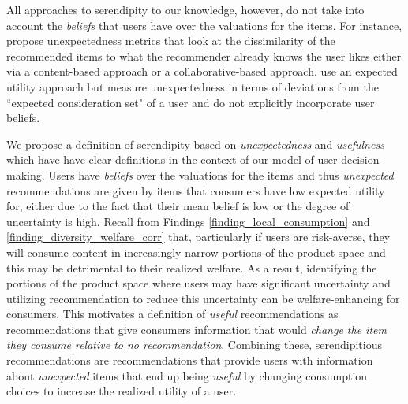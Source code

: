 \documentclass[sigconf]{acmart}
\begin{document}
All approaches to serendipity to our knowledge, however, do not take into account the \textit{beliefs} that users have over the valuations for the items. For instance, \cite{vargas2011rank, kaminskas2014measuring} propose unexpectedness metrics that look at the dissimilarity of the recommended items to what the recommender already knows the user likes either via a content-based approach or a collaborative-based approach. \cite{adamopoulos2015unexpectedness} use an expected utility approach but measure unexpectedness in terms of deviations from the ``expected consideration set" of a user and do not explicitly incorporate user beliefs.

We propose a definition of serendipity based on \textit{unexpectedness} and \textit{usefulness} which have have clear definitions in the context of our model of user decision-making. Users have \textit{beliefs} over the valuations for the items and thus \textit{unexpected} recommendations are given by items that consumers have low expected utility for, either due to the fact that their mean belief is low or the degree of uncertainty is high. Recall from Findings \ref{finding_local_consumption} and \ref{finding_diversity_welfare_corr} that, particularly if users are risk-averse, they will consume content in increasingly narrow portions of the product space and this may be detrimental to their realized welfare. As a result, identifying the portions of the product space where users may have significant uncertainty and utilizing recommendation to reduce this uncertainty can be welfare-enhancing for consumers. This motivates a definition of \textit{useful} recommendations as recommendations that give consumers information that would \textit{change the item they consume relative to no recommendation}. Combining these, serendipitious recommendations are recommendations that provide users with information about \textit{unexpected} items that end up being \textit{useful} by changing consumption choices to increase the realized utility of a user.
\end{document}
